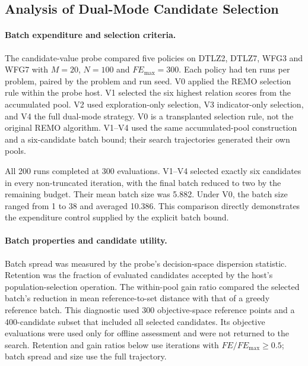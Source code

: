 
\subsection{Analysis of Dual-Mode Candidate Selection}
\label{sec:exp:candidate}

\paragraph{Batch expenditure and selection criteria.}
The candidate-value probe compared five policies on DTLZ2, DTLZ7, WFG3
and WFG7 with $M=20$, $N=100$ and $FE_{\max}=300$. Each policy had ten
runs per problem, paired by the problem and run seed. V0 applied the
REMO selection rule within the probe host. V1 selected the six highest
relation scores from the accumulated pool. V2 used exploration-only
selection, V3 indicator-only selection, and V4 the full dual-mode
strategy. V0 is a transplanted selection rule, not the original REMO
algorithm. V1--V4 used the same accumulated-pool construction and a
six-candidate batch bound; their search trajectories generated their
own pools.

All 200 runs completed at 300 evaluations. V1--V4 selected exactly six
candidates in every non-truncated iteration, with the final batch
reduced to two by the remaining budget. Their mean batch size was
5.882. Under V0, the batch size ranged from 1 to 38 and averaged 10.386.
This comparison directly demonstrates the expenditure control supplied
by the explicit batch bound.

\paragraph{Batch properties and candidate utility.}
Batch spread was measured by the probe's decision-space dispersion
statistic. Retention was the fraction of evaluated candidates accepted
by the host's population-selection operation. The within-pool gain
ratio compared the selected batch's reduction in mean reference-to-set
distance with that of a greedy reference batch. This diagnostic used
300 objective-space reference points and a 400-candidate subset that
included all selected candidates. Its objective evaluations were used
only for offline assessment and were not returned to the search.
Retention and gain ratios below use iterations with
$FE/FE_{\max}\geq0.5$; batch spread and size use the full trajectory.

